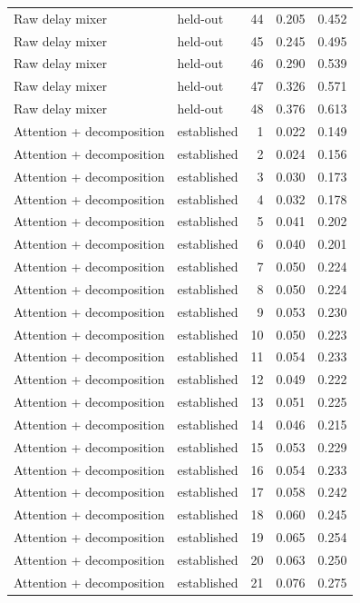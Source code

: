 \begin{tabular}{llrrr}
Raw delay mixer & held-out & 44 & 0.205 & 0.452 \\
Raw delay mixer & held-out & 45 & 0.245 & 0.495 \\
Raw delay mixer & held-out & 46 & 0.290 & 0.539 \\
Raw delay mixer & held-out & 47 & 0.326 & 0.571 \\
Raw delay mixer & held-out & 48 & 0.376 & 0.613 \\
Attention + decomposition & established & 1 & 0.022 & 0.149 \\
Attention + decomposition & established & 2 & 0.024 & 0.156 \\
Attention + decomposition & established & 3 & 0.030 & 0.173 \\
Attention + decomposition & established & 4 & 0.032 & 0.178 \\
Attention + decomposition & established & 5 & 0.041 & 0.202 \\
Attention + decomposition & established & 6 & 0.040 & 0.201 \\
Attention + decomposition & established & 7 & 0.050 & 0.224 \\
Attention + decomposition & established & 8 & 0.050 & 0.224 \\
Attention + decomposition & established & 9 & 0.053 & 0.230 \\
Attention + decomposition & established & 10 & 0.050 & 0.223 \\
Attention + decomposition & established & 11 & 0.054 & 0.233 \\
Attention + decomposition & established & 12 & 0.049 & 0.222 \\
Attention + decomposition & established & 13 & 0.051 & 0.225 \\
Attention + decomposition & established & 14 & 0.046 & 0.215 \\
Attention + decomposition & established & 15 & 0.053 & 0.229 \\
Attention + decomposition & established & 16 & 0.054 & 0.233 \\
Attention + decomposition & established & 17 & 0.058 & 0.242 \\
Attention + decomposition & established & 18 & 0.060 & 0.245 \\
Attention + decomposition & established & 19 & 0.065 & 0.254 \\
Attention + decomposition & established & 20 & 0.063 & 0.250 \\
Attention + decomposition & established & 21 & 0.076 & 0.275 \\

\end{tabular}
